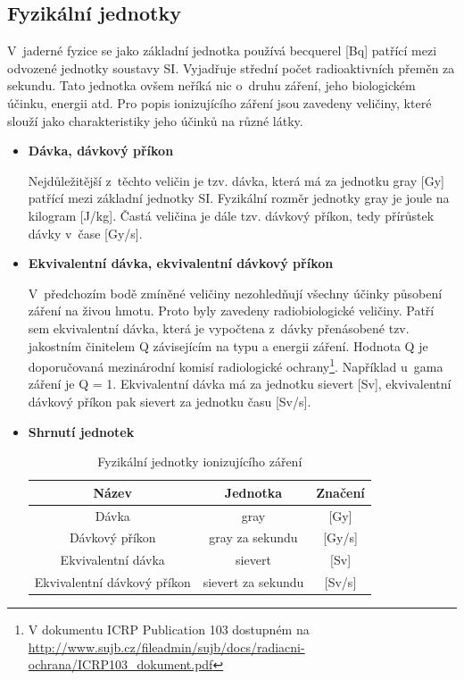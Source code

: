 \subsection{Fyzikální jednotky} V~jaderné fyzice se jako základní
jednotka používá becquerel [Bq] patřící mezi odvozené jednotky
soustavy SI. Vyjadřuje střední počet radioaktivních přeměn za
sekundu. Tato jednotka ovšem neříká nic o~druhu záření, jeho
biologickém účinku, energii atd. Pro popis ionizujícího záření jsou
zavedeny veličiny, které slouží jako charakteristiky jeho účinků na
různé látky. \cite{atomInfo}

\begin{itemize}
	\item \textbf{Dávka, dávkový příkon}
	
		 Nejdůležitější z~těchto veličin je tzv. dávka, která
má za jednotku gray [Gy] patřící mezi základní jednotky SI. Fyzikální
rozměr jednotky gray je joule na kilogram [J/kg]. Častá veličina je
dále tzv. dávkový příkon, tedy přírůstek dávky v~čase [Gy/s].
		
	\item \textbf{Ekvivalentní dávka, ekvivalentní dávkový příkon}

	 	V~předchozím bodě zmíněné veličiny nezohledňují
všechny účinky působení záření na živou hmotu. Proto byly zavedeny
radiobiologické veličiny. Patří sem ekvivalentní dávka, která je
vypočtena z~dávky přenásobené tzv. jakostním činitelem Q závisejícím
na typu a energii záření. Hodnota Q je doporučovaná mezinárodní komisí
radiologické ochrany\footnote{V dokumentu ICRP Publication 103
dostupném na
\url{http://www.sujb.cz/fileadmin/sujb/docs/radiacni-ochrana/ICRP103\_dokument.pdf}}. Například
u~gama záření je Q = 1. Ekvivalentní dávka má za jednotku sievert
[Sv], ekvivalentní dávkový příkon pak sievert za jednotku času [Sv/s].
	 	
	\item \textbf{Shrnutí jednotek}
	
		\begin{table}[h!]  \centering
			\caption{Fyzikální jednotky ionizujícího
záření}
			\label{tab:tabulkaJednotek}
			\begin{tabular}{|c|c|c|} \hline \textbf{Název}
& \textbf{Jednotka} & \textbf{Značení} \\ \hline Dávka & gray &
{[}Gy{]} \\ \hline Dávkový příkon & gray za sekundu & {[}Gy/s{]} \\
\hline Ekvivalentní dávka & sievert & {[}Sv{]} \\ \hline Ekvivalentní
dávkový příkon & sievert za sekundu & {[}Sv/s{]} \\ \hline
			\end{tabular}
		\end{table}
\end{itemize}

